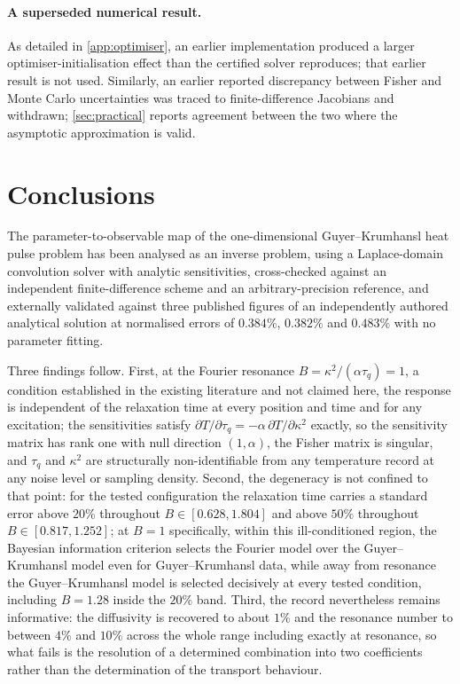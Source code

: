 \documentclass[preprint,12pt,a4paper]{elsarticle}
\theoremstyle{plain}
\theoremstyle{definition}
\theoremstyle{remark}
\newcommand{\tq}{\tau_{q}}
\newcommand{\kk}{\kappa^{2}}
\newcommand{\Bnum}{B}
\begin{document}
\paragraph{A superseded numerical result.}
As detailed in \ref{app:optimiser}, an earlier implementation produced a
larger optimiser-initialisation effect than the certified solver reproduces;
that earlier result is not used. Similarly, an earlier reported discrepancy
between Fisher and Monte Carlo uncertainties was traced to finite-difference
Jacobians and withdrawn; \cref{sec:practical} reports agreement between the two
where the asymptotic approximation is valid.

\section{Conclusions}
\label{sec:conclusions}

The parameter-to-observable map of the one-dimensional Guyer--Krumhansl heat
pulse problem has been analysed as an inverse problem, using a Laplace-domain
convolution solver with analytic sensitivities, cross-checked against an
independent finite-difference scheme and an arbitrary-precision reference, and
externally validated against three published figures of an independently
authored analytical solution at normalised errors of $0.384\%$, $0.382\%$ and
$0.483\%$ with no parameter fitting.

Three findings follow. First, at the Fourier resonance
$\Bnum = \kk/(\alpha\tq) = 1$, a condition established in the existing
literature and not claimed here, the response is independent of the relaxation
time at every position and time and for any excitation; the sensitivities
satisfy $\partial T/\partial \tq = -\alpha\,\partial T/\partial \kk$ exactly, so
the sensitivity matrix has rank one with null direction $(1,\alpha)$, the Fisher
matrix is singular, and $\tq$ and $\kk$ are structurally non-identifiable from
any temperature record at any noise level or sampling density. Second, the
degeneracy is not confined to that point: for the tested configuration the
relaxation time carries a standard error above $20\%$ throughout
$\Bnum \in [0.628, 1.804]$ and above $50\%$ throughout
$\Bnum \in [0.817, 1.252]$; at $\Bnum=1$ specifically, within this
ill-conditioned region, the Bayesian information
criterion selects the Fourier model over the Guyer--Krumhansl model even for
Guyer--Krumhansl data, while away from resonance the Guyer--Krumhansl model is
selected decisively at every tested condition, including $\Bnum=1.28$ inside
the $20\%$ band. Third, the record nevertheless remains informative: the
diffusivity is recovered to about $1\%$ and the resonance number to between
$4\%$ and $10\%$ across the whole range including exactly at resonance, so what
fails is the resolution of a determined combination into two coefficients rather
than the determination of the transport behaviour.
\end{document}
